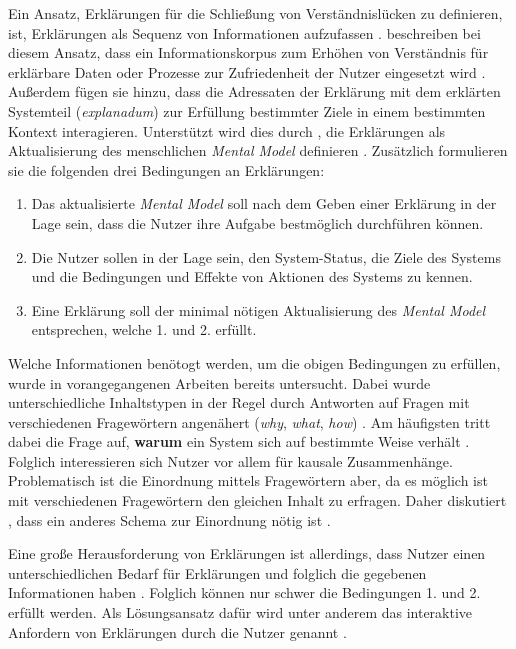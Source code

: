 Ein Ansatz, Erklärungen für die Schließung von Verständnislücken zu definieren, ist, Erklärungen als Sequenz von Informationen aufzufassen \cite[vgl.][]{wang_integration_2020}. \citeauthor{sovrano_modelling_2020} beschreiben bei diesem Ansatz, dass ein Informationskorpus zum Erhöhen von Verständnis für erklärbare Daten oder Prozesse zur Zufriedenheit der Nutzer eingesetzt wird \cite[übersetzt vgl.][]{sovrano_modelling_2020}. Außerdem fügen sie hinzu, dass die Adressaten der Erklärung mit dem erklärten Systemteil (\textit{explanadum}) zur Erfüllung bestimmter Ziele in einem bestimmten Kontext interagieren. Unterstützt wird dies durch \citeauthor{zahedi_towards_2019}, die Erklärungen als \glqq Aktualisierung des menschlichen \textit{Mental Model}\grqq{} definieren \cite[übersetzt vgl.][]{zahedi_towards_2019}. Zusätzlich formulieren sie die folgenden drei Bedingungen an Erklärungen:
\begin{enumerate}
    \item Das aktualisierte \textit{Mental Model} soll nach dem Geben einer Erklärung in der Lage sein, dass die Nutzer ihre Aufgabe bestmöglich durchführen können.
    \item Die Nutzer sollen in der Lage sein, den System-Status, die Ziele des Systems und die Bedingungen und Effekte von Aktionen des Systems zu kennen.
    \item Eine Erklärung soll der minimal nötigen Aktualisierung des \textit{Mental Model} entsprechen, welche 1. und 2. erfüllt.
\end{enumerate}

Welche Informationen benötogt werden, um die obigen Bedingungen zu erfüllen, wurde in vorangegangenen Arbeiten bereits untersucht. Dabei wurde unterschiedliche Inhaltstypen in der Regel durch Antworten auf Fragen mit verschiedenen Fragewörtern angenähert (\textit{why}, \textit{what}, \textit{how}) \cite{rosenfeld_explainability_2019}. Am häufigsten tritt dabei die Frage auf, \textbf{warum} ein System sich auf bestimmte Weise verhält \cite{chazette2020explainability}. Folglich interessieren sich Nutzer vor allem für kausale Zusammenhänge. Problematisch ist die Einordnung mittels Fragewörtern aber, da es möglich ist mit verschiedenen Fragewörtern den gleichen Inhalt zu erfragen. Daher diskutiert \citeauthor{wang_integration_2020}, dass ein anderes Schema zur Einordnung nötig ist \cite{wang_integration_2020}.

Eine große Herausforderung von Erklärungen ist allerdings, dass Nutzer einen unterschiedlichen Bedarf für Erklärungen und folglich die gegebenen Informationen haben \cite{chazette2020explainability}. Folglich können nur schwer die Bedingungen 1. und 2. erfüllt werden. Als Lösungsansatz dafür wird unter anderem das interaktive Anfordern von Erklärungen durch die Nutzer genannt \cite{chazette_end-users_nodate}.

